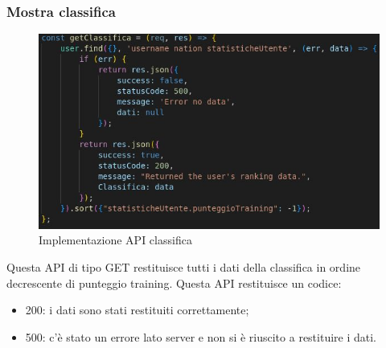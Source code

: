 \subsubsection{Mostra classifica}
\begin{figure}[!h]
\centering
\includegraphics[scale=0.4]{images/api_classifica.jpg}
\caption{Implementazione API classifica}
\label{fig:api_classifica}
\end{figure}
\noindent
Questa API di tipo GET restituisce tutti i dati della classifica in ordine decrescente di punteggio training. 
Questa API restituisce un codice:
\begin{itemize}
    \item 200: i dati sono stati restituiti correttamente;
    \item 500: c'è stato un errore lato server e non si è riuscito a restituire i dati.
\end{itemize}

